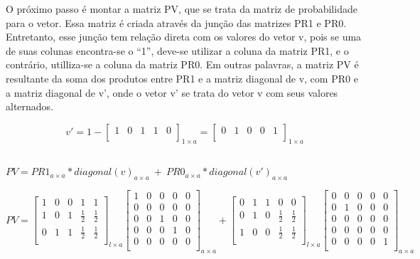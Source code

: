 \begin{anexosenv}
O próximo passo é montar a matriz PV, que se trata da matriz de
probabilidade para o vetor. Essa matriz é criada através da junção das matrizes
PR1 e PR0. Entretanto, esse junção tem relação direta com os valores do vetor v,
pois se uma de suas colunas encontra-se o ``1'', deve-se utilizar a coluna da matriz PR1,
e o contrário, utilliza-se a coluna da matriz PR0. Em outras palavras, a matriz PV é resultante
da soma dos produtos entre PR1 e a matriz diagonal de v, com PR0
e a matriz diagonal de v', onde o vetor v' se trata do vetor v com seus valores
alternados.

$$v'=1-\left[
\begin{array}{ccccc}
1 & 0 & 1 & 1 & 0 \\
\end{array}
\right]_{1 \times a}
=
\left[
\begin{array}{ccccc}
0 & 1 & 0 & 0 & 1 \\
\end{array}
\right]_{1 \times a}
$$
\\

\begin{center}
$PV = PR1_{a \times a} * diagonal(v)_{a \times a} \ + \ PR0_{a \times a} * diagonal(v')_{a \times a}$
\end{center}

$$PV=
\left[
\begin{array}{ccccc}
1 & 0 & 0 & 1 & 1 \\
1 & 0 & 1 & \frac{1}{2} & \frac{1}{2} \\
0 & 1 & 1 & \frac{1}{2} & \frac{1}{2} \\
\end{array}
\right]_{l \times a}
\left[
\begin{array}{ccccc}
1 & 0 & 0 & 0 & 0 \\
0 & 0 & 0 & 0 & 0 \\
0 & 0 & 1 & 0 & 0 \\
0 & 0 & 0 & 1 & 0 \\
0 & 0 & 0 & 0 & 0 \\
\end{array}
\right]_{a \times a}
+
\left[
\begin{array}{ccccc}
0 & 1 & 1 & 0 & 0 \\
0 & 1 & 0 & \frac{1}{2} & \frac{1}{2} \\
1 & 0 & 0 & \frac{1}{2} & \frac{1}{2} \\
\end{array}
\right]_{l \times a}
\left[
\begin{array}{ccccc}
0 & 0 & 0 & 0 & 0 \\
0 & 1 & 0 & 0 & 0 \\
0 & 0 & 0 & 0 & 0 \\
0 & 0 & 0 & 0 & 0 \\
0 & 0 & 0 & 0 & 1 \\
\end{array}
\right]_{a \times a}
$$


\end{anexosenv}
